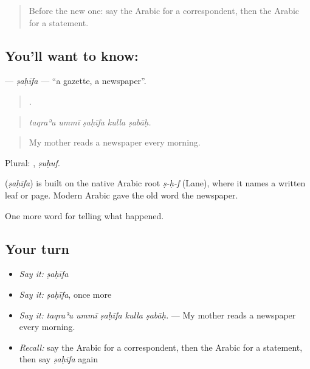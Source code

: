 \label{lesson:AR-C293-sahifa}



\begin{quote}
Before the new one: say the Arabic for a correspondent, then the Arabic for a statement.
\end{quote}

\subsection*{You'll want to know: }
\textbf{} — \emph{ṣaḥīfa} — \textquotedblleft{}a gazette, a newspaper\textquotedblright{}.

\begin{quote}
    .
\end{quote}

\begin{quote}
\emph{taqraʾu ummī ṣaḥīfa kulla ṣabāḥ.}
\end{quote}

\begin{quote}
My mother reads a newspaper every morning.
\end{quote}

Plural: , \emph{ṣuḥuf}.

\begin{cousinweb}
\textbf{} (\emph{ṣaḥīfa}) is built on the native Arabic root \emph{ṣ-ḥ-f} (Lane), where it names a written leaf or page. Modern Arabic gave the old word the newspaper.
\end{cousinweb}

\begin{grammarlens}[title={What you've built}]
One more word for telling what happened.
\end{grammarlens}

\subsection*{Your turn}
\begin{itemize}
\raggedright
  \item \emph{Say it:} \emph{ṣaḥīfa}
  \item \emph{Say it:} \emph{ṣaḥīfa}, once more
  \item \emph{Say it:} \emph{taqraʾu ummī ṣaḥīfa kulla ṣabāḥ.} — My mother reads a newspaper every morning.
  \item \emph{Recall:} say the Arabic for a correspondent, then the Arabic for a statement, then say \emph{ṣaḥīfa} again
\end{itemize}

